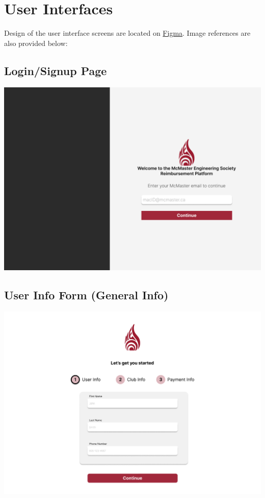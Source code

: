 \documentclass[12pt, titlepage]{article}
\begin{document}

\newpage

\section{User Interfaces}

Design of the user interface screens are located on \href{https://www.figma.com/design/44vRz90xLocsOkyLXjaODB/MES-Finance-Platform?node-id=0-1&t=uPGJjQawfH5iIdCy-1}{Figma}. Image references are also provided below:

\subsection{Login/Signup Page}
\includegraphics[]{imgs/LoginSignupPage.png}

\subsection{User Info Form (General Info)}
\includegraphics[]{imgs/UserInfoForm-GeneralInfo.png}
\end{document}
